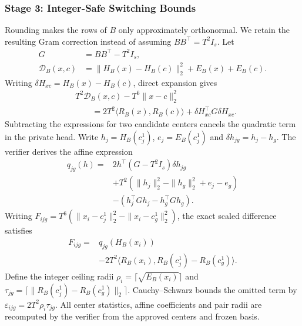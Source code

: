 \subsubsection{Stage 3: Integer-Safe Switching Bounds}
\label{sec:methodology-switching}
Rounding makes the rows of $B$ only approximately orthonormal. We retain the
resulting Gram correction instead of assuming $BB^\top=T^2I_s$. Let
\begin{equation}
 \begin{aligned}
 G&=BB^\top-T^2I_s,\\
 \mathcal D_B(x,c)&=\|H_B(x)-H_B(c)\|_2^2+E_B(x)+E_B(c).
 \end{aligned}
 \label{eq:methodology-gram}
\end{equation}
Writing $\delta H_{xc}=H_B(x)-H_B(c)$, direct expansion gives
\begin{equation}
 \begin{aligned}
 &T^2\mathcal D_B(x,c)-T^6\|x-c\|_2^2\\
 &\qquad=2T^2\langle R_B(x),R_B(c)\rangle
       +\delta H_{xc}^\top G\delta H_{xc}.
 \end{aligned}
 \label{eq:methodology-rounded-identity}
\end{equation}
Subtracting the expressions for two candidate centers cancels the quadratic
term in the private head. Write $h_j=H_B(c^1_j)$, $e_j=E_B(c^1_j)$ and
$\delta h_{jg}=h_j-h_g$. The verifier derives the affine expression
\begin{align}
 q_{jg}(h)={}&2h^\top(G-T^2I_s)\delta h_{jg}\nonumber\\
 &+T^2(\|h_j\|_2^2-\|h_g\|_2^2+e_j-e_g)\nonumber\\
 &-(h_j^\top Gh_j-h_g^\top Gh_g).
 \label{eq:methodology-affine}
\end{align}
Writing $F_{ijg}=T^6(\|x_i-c^1_j\|_2^2-\|x_i-c^1_g\|_2^2)$, the exact
scaled difference satisfies
\begin{equation}
 \begin{aligned}
 F_{ijg}={}&q_{jg}(H_B(x_i))\\
 &-2T^2\langle R_B(x_i),R_B(c^1_j)-R_B(c^1_g)\rangle.
 \end{aligned}
 \label{eq:methodology-pair-difference}
\end{equation}
Define the integer ceiling radii
$\rho_i=\lceil\sqrt{E_B(x_i)}\rceil$ and
$\tau_{jg}=\lceil\|R_B(c^1_j)-R_B(c^1_g)\|_2\rceil$.
Cauchy--Schwarz bounds the omitted term by
$\varepsilon_{ijg}=2T^2\rho_i\tau_{jg}$. All center statistics, affine
coefficients and pair radii are recomputed by the verifier from the approved
centers and frozen basis.

